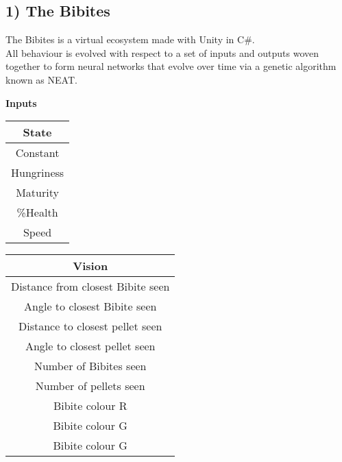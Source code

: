 \documentclass{article}
\begin{document}
\subsection*{1) The Bibites}
The Bibites is a virtual ecosystem made with Unity in C\#.\\
All behaviour is evolved with respect to a set of inputs and outputs woven together to form neural networks that evolve over time via a genetic algorithm known as NEAT.\\
\begin{center}
    \textbf{Inputs}
\end{center}
\begin{center}
    \begin{tabular}{||c||}
        \hline
        State\\
        \hline \hline
        Constant\\
        \hline
        Hungriness\\
        \hline
        Maturity\\
        \hline
        \%Health\\
        \hline
        Speed\\
        \hline
    \end{tabular}
    \begin{tabular}{||c||}
        \hline
        Vision\\
        \hline \hline
        Distance from closest Bibite seen\\
        \hline
        Angle to closest Bibite seen\\
        \hline
        Distance to closest pellet seen\\
        \hline
        Angle to closest pellet seen\\
        \hline
        Number of Bibites seen\\
        \hline
        Number of pellets seen\\
        \hline
        Bibite colour R\\
        \hline
        Bibite colour G\\
        \hline
        Bibite colour G\\
        \hline
    \end{tabular}
\end{center}
\end{document}
